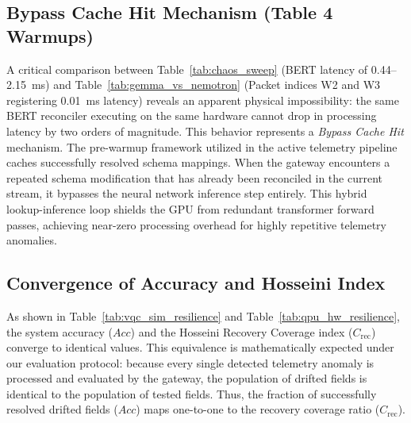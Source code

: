 \documentclass[11pt]{article}
\begin{document}
\subsection{Bypass Cache Hit Mechanism (Table 4 Warmups)}
A critical comparison between Table~\ref{tab:chaos_sweep} (BERT latency of 0.44--2.15~ms) and Table~\ref{tab:gemma_vs_nemotron} (Packet indices W2 and W3 registering 0.01~ms latency) reveals an apparent physical impossibility: the same BERT reconciler executing on the same hardware cannot drop in processing latency by two orders of magnitude. This behavior represents a \textit{Bypass Cache Hit} mechanism. The pre-warmup framework utilized in the active telemetry pipeline caches successfully resolved schema mappings. When the gateway encounters a repeated schema modification that has already been reconciled in the current stream, it bypasses the neural network inference step entirely. This hybrid lookup-inference loop shields the GPU from redundant transformer forward passes, achieving near-zero processing overhead for highly repetitive telemetry anomalies.

\subsection{Convergence of Accuracy and Hosseini Index}
As shown in Table~\ref{tab:vqc_sim_resilience} and Table~\ref{tab:qpu_hw_resilience}, the system accuracy ($Acc$) and the Hosseini Recovery Coverage index ($C_{\text{rec}}$) converge to identical values. This equivalence is mathematically expected under our evaluation protocol: because every single detected telemetry anomaly is processed and evaluated by the gateway, the population of drifted fields is identical to the population of tested fields. Thus, the fraction of successfully resolved drifted fields ($Acc$) maps one-to-one to the recovery coverage ratio ($C_{\text{rec}}$).
\end{document}
